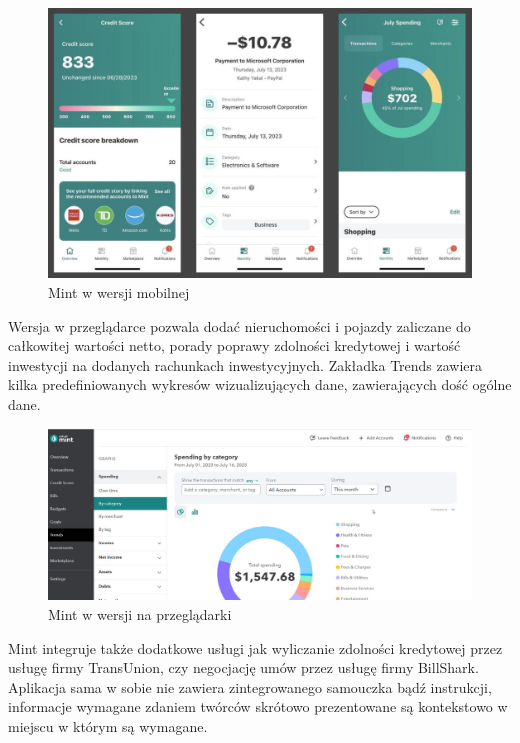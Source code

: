 \documentclass[a4paper,10pt, twoside]{report}
\begin{document}
\begin{large}
\begin{figure}[H]           %
    \centering
    \includegraphics[width=12cm]{figures/pcmag_mintmobile_05OMSsUmroXJ6F6sETKpH9R-50.fit_lim.size_1152x.jpg}
    \caption{Mint w wersji mobilnej}
    \label{mintmobile}
\end{figure}

{Wersja w przeglądarce pozwala dodać nieruchomości i pojazdy zaliczane do 
całkowitej wartości netto, porady poprawy zdolności kredytowej i wartość 
inwestycji na dodanych rachunkach inwestycyjnych. Zakładka Trends zawiera 
kilka predefiniowanych wykresów wizualizujących dane, zawierających dość ogólne 
dane.}

\begin{figure}[H]           %
    \centering
    \includegraphics[width=12cm]{figures/pcmag_mintweb_05OMSsUmroXJ6F6sETKpH9R-51.fit_lim.size_1152x.jpg}
    \caption{Mint w wersji na przeglądarki}
    \label{fig:mintweb}
\end{figure}

{Mint integruje także dodatkowe usługi jak wyliczanie zdolności kredytowej przez 
usługę firmy TransUnion, czy negocjację umów przez usługę firmy BillShark. 
Aplikacja sama w sobie nie zawiera zintegrowanego samouczka bądź instrukcji, 
informacje wymagane zdaniem twórców skrótowo prezentowane są kontekstowo w miejscu w 
którym są wymagane.}


\end{large}
\end{document}
